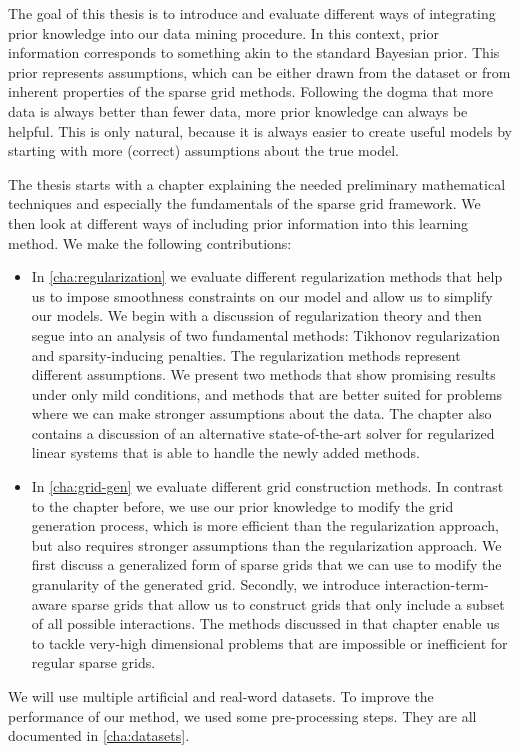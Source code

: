 The goal of this thesis is to introduce and evaluate different ways of integrating prior knowledge into our data mining procedure.
In this context, prior information corresponds to something akin to the standard Bayesian prior.
This prior represents assumptions, which can be either drawn from the dataset or from inherent properties of the sparse grid methods.
Following the dogma that more data is always better than fewer data, more prior
knowledge can always be helpful.
This is only natural, because it is always easier to create useful
models by starting with more (correct) assumptions about the true model.

The thesis starts with a chapter explaining the needed preliminary mathematical
techniques and especially the fundamentals of the sparse grid framework.
We then look at different ways of including prior information into this learning method.
We make the following contributions:
\begin{itemize}
\item In \cref{cha:regularization} we evaluate different regularization
  methods that help us to impose smoothness constraints on our model and allow us
  to simplify our models.
  We begin with a discussion of regularization theory and then segue into an
  analysis of two fundamental methods: Tikhonov regularization and
  sparsity-inducing penalties.
  The regularization methods represent different assumptions.
  We present two methods that show promising results under only mild conditions,
  and methods that are better suited for problems where we can make stronger
  assumptions about the data.
  The chapter also contains a discussion of an alternative state-of-the-art solver for regularized linear systems that is able to handle the newly added methods.
\item In \cref{cha:grid-gen} we evaluate different grid construction methods.
  In contrast to the chapter before, we use our prior knowledge to modify the
  grid generation process, which is more efficient than the regularization
  approach, but also requires stronger assumptions than the regularization approach.
  We first discuss a generalized form of sparse grids that we can use to modify
  the granularity of the generated grid.
  Secondly, we introduce interaction-term-aware sparse grids that allow us to
  construct grids that only include a subset of all possible interactions.
  The methods discussed in that chapter enable us to tackle very-high dimensional problems that are impossible or inefficient for regular sparse grids.
\end{itemize}

We will use multiple artificial and real-word datasets.
To improve the performance of our method, we used some pre-processing steps.
They are all documented in \cref{cha:datasets}.

